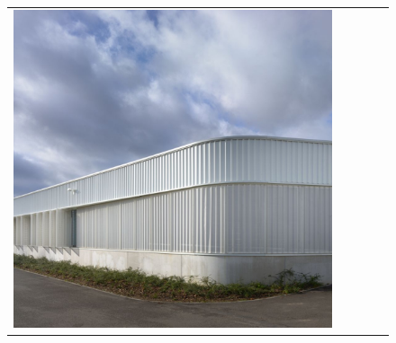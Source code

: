 \begin{figure}[H]
{\begin{tabular}{@{}ccccc@{}}
      \includegraphics[width=\linewidth]{Images/LoRAs/Plintwerking/Training_images/10.jpg} \\[2pt]


\end{tabular}}
\end{figure}
